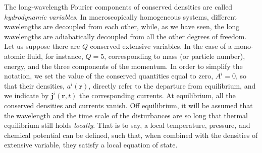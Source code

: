 The long-wavelength Fourier components of conserved densities are called \emph{hydrodynamic variables}. In macroscopically homogeneous systems, different wavelengths are decoupled from each other, while, as we have seen, the long wavelengths are adiabatically decoupled from all the other degrees of freedom. Let us suppose there are $Q$ conserved extensive variables. In the case of a mono-atomic fluid, for instance, $Q=5$, corresponding to mass (or particle number), energy, and the three components of the momentum. In order to simplify the notation, we set the value of the conserved quantities equal to zero, $A^i=0$, so that their densities, $a^i(\mathbf{r})$, directly refer to the departure from equilibrium, and we indicate by $\bm j^i(\mathbf{r},t)$ the corresponding currents. At equilibrium, all the conserved densities and currents vanish. Off equilibrium, it will be assumed that the wavelength and the time scale of the disturbances are so long that thermal equilibrium still holds \emph{locally}. That is to say, a local temperature, pressure, and chemical potential can be defined, such that, when combined with the densities of extensive variable, they satisfy a local equation of state.

